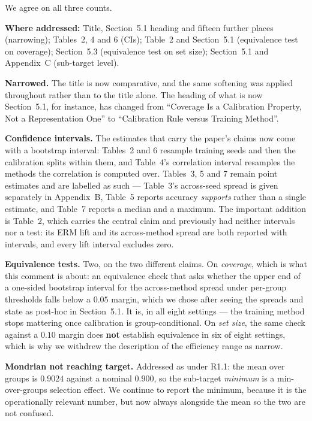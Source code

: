 \documentclass[11pt,a4paper]{article}
\newcommand{\where}[1]{{\textbf{Where addressed:} #1\par}}
\begin{document}
We agree on all three counts.

\where{Title, Section~5.1 heading and fifteen further places (narrowing); Tables~2, 4
and 6 (CIs); Table~2 and Section~5.1 (equivalence test on coverage); Section~5.3 (equivalence
test on set size); Section~5.1 and Appendix~C (sub-target level).}

\textbf{Narrowed.} The title is now comparative, and the same softening was applied throughout
rather than to the title alone. The heading of what is now Section~5.1, for instance, has changed from ``Coverage Is
a Calibration Property, Not a Representation One'' to ``Calibration Rule versus Training Method''.

\textbf{Confidence intervals.} The estimates that carry the paper's claims now come with a
bootstrap interval: Tables~2 and 6 resample training seeds and then the calibration splits within
them, and Table~4's correlation interval resamples the methods the correlation is computed over. Tables~3, 5 and 7 remain point estimates and are labelled as such --- Table~3's across-seed spread is given separately in Appendix~B, Table~5 reports
accuracy \emph{supports} rather than a single estimate, and Table~7 reports a median and a maximum.
The important addition is Table~2, which carries the central claim and previously had neither
intervals nor a test: its ERM lift and its across-method spread are both reported with intervals, and every lift
interval excludes zero.

\textbf{Equivalence tests.} Two, on the two different claims. On \emph{coverage}, which is what this
comment is about: an equivalence check that asks whether the upper end of a one-sided bootstrap
interval for the across-method spread under per-group thresholds falls below a $0.05$ margin, which
we chose after seeing the spreads and state as post-hoc in Section~5.1. It is, in all eight settings --- the
training method stops mattering once calibration is group-conditional. On \emph{set size}, the
same check against a $0.10$ margin does \textbf{not} establish equivalence in six of eight
settings, which is why we withdrew the description of the efficiency range as narrow.

\textbf{Mondrian not reaching target.} Addressed as under R1.1: the mean over groups is $0.9024$
against a nominal $0.900$, so the sub-target \emph{minimum} is a min-over-groups selection effect.
We continue to report the minimum, because it is the operationally relevant number, but now always
alongside the mean so the two are not confused.
\end{document}

